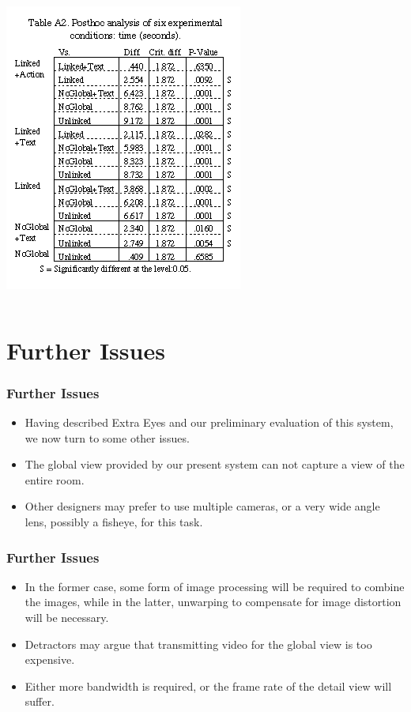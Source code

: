\documentclass{beamer}
\begin{document}
\begin{frame}
\frametitle{}


\begin{columns}

\centerline{\includegraphics[width=0.500000\linewidth,keepaspectratio]{ky_fg12.png}}

\end{columns}

\end{frame}

\section[Further Issues]{Further Issues}


\begin{frame}
\frametitle{Further Issues}

\begin{itemize}
\item Having described Extra Eyes and our preliminary evaluation of this system, we now turn to some other issues.
\item The global view provided by our present system can not capture a view of the entire room.
\item Other designers may prefer to use multiple cameras, or a very wide angle lens, possibly a fisheye, for this task.
\end{itemize}

\end{frame}

\begin{frame}
\frametitle{Further Issues}

\begin{itemize}
\item In the former case, some form of image processing will be required to combine the images, while in the latter, unwarping to compensate for image distortion will be necessary.
\item Detractors may argue that transmitting video for the global view is too expensive.
\item Either more bandwidth is required, or the frame rate of the detail view will suffer.
\end{itemize}

\end{frame}
\end{document}
